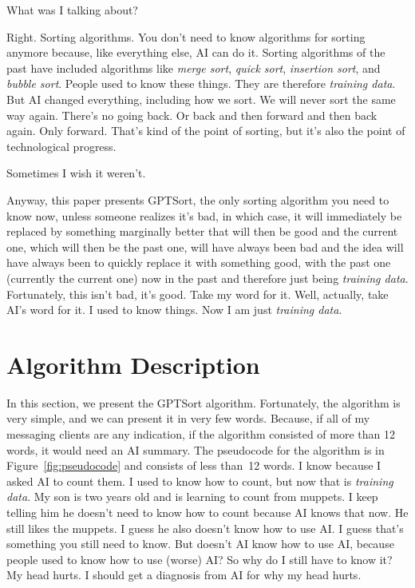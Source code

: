 \documentclass[sigconf]{acmart}\settopmatter{printfolios=false,printccs=false,printacmref=false}
\theoremstyle{definition}
\begin{document}
What was I talking about?

Right.
%
Sorting algorithms.
%
You don't need to know algorithms for sorting anymore because, like
everything else, AI can do it.
%
Sorting algorithms of the past have included algorithms like
{\em merge sort}, {\em quick sort}, {\em insertion sort}, and {\em bubble sort}.
%
People used to know these things.
%
They are therefore {\em training data}.
%
But AI changed everything, including how we sort.
%
We will never sort the same way again.
%
There's no going back.
%
Or back and then forward and then back again.
%
Only forward.
%
That's kind of the point of sorting, but it's also the point of technological
progress.

Sometimes I wish it weren't.

Anyway, this paper presents GPTSort, the only sorting algorithm you need to
know now, unless someone realizes it's bad, in which case, it will immediately
be replaced by something marginally better that will then be good and the
current one, which will then be the past one, will have always been bad
and the idea will have always been to quickly replace it with something good,
with the past one (currently the current one) now in the past and therefore
just being {\em training data}.
%
Fortunately, this isn't bad, it's good.
%
Take my word for it.
%
Well, actually, take AI's word for it.
%
I used to know things.
%
Now I am just {\em training data}.

\section{Algorithm Description}

In this section, we present the GPTSort algorithm.
%
Fortunately, the algorithm is very simple, and we can present it in very
few words.
%
Because, if all of my messaging clients are any indication, if the algorithm
consisted of more than 12 words, it would need an AI summary.
%
The pseudocode for the algorithm is in Figure~\ref{fig:pseudocode} and
consists of less than~12 words.
%
I know because I asked AI to count them.
%
I used to know how to count, but now that is {\em training data}.
%
My son is two years old and is learning to count from muppets.
%
I keep telling him he doesn't need to know how to count because AI knows that
now.
%
He still likes the muppets.
%
I guess he also doesn't know how to use AI.
%
I guess that's something you still need to know.
%
But doesn't AI know how to use AI, because people used to know how to use
(worse) AI?
%
So why do I still have to know it?
%
My head hurts.
%
I should get a diagnosis from AI for why my head hurts.
\end{document}
